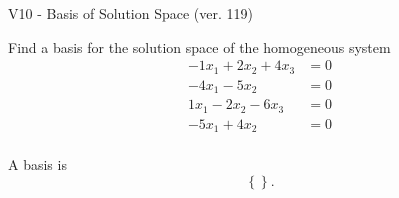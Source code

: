 \begin{exercise}
  \begin{exerciseTitle}V10 - Basis of Solution Space (ver. 119)\end{exerciseTitle}
  \begin{exerciseStatement}
    Find a basis for the solution space of the homogeneous system 
\begin{align*}
 -1 x_ 1 + 2 x_ 2 + 4 x_ 3 &= 0  \\ 
  -4 x_ 1 -5 x_ 2 &= 0  \\ 
  1 x_ 1 -2 x_ 2 -6 x_ 3 &= 0  \\ 
  -5 x_ 1 + 4 x_ 2 &= 0  \\ 
 \end{align*}


 
  \end{exerciseStatement}

  \begin{exerciseAnswer}
   A basis is   
\[\left\{\right\}.\]

  


  \end{exerciseAnswer}
\end{exercise}